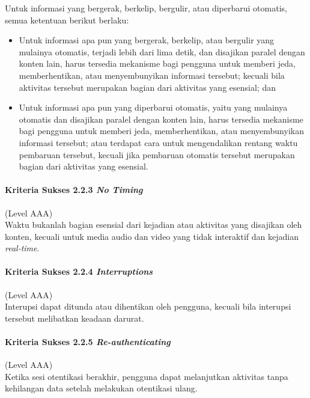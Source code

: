 Untuk informasi yang bergerak, berkelip, bergulir, atau diperbarui otomatis, semua ketentuan berikut berlaku:
\begin{itemize}
	\item Untuk informasi apa pun yang bergerak, berkelip, atau bergulir yang mulainya otomatis, terjadi lebih dari lima detik, dan disajikan paralel dengan konten lain, harus tersedia mekanisme bagi pengguna untuk memberi jeda, memberhentikan, atau menyembunyikan informasi tersebut; kecuali bila aktivitas tersebut merupakan bagian dari aktivitas yang esensial; dan
	\item Untuk informasi apa pun yang diperbarui otomatis, yaitu yang mulainya otomatis dan disajikan paralel dengan konten lain, harus tersedia mekanisme bagi pengguna untuk memberi jeda, memberhentikan, atau menyembunyikan informasi tersebut; atau terdapat cara untuk mengendalikan rentang waktu pembaruan tersebut, kecuali jika pembaruan otomatis tersebut merupakan bagian dari aktivitas yang esensial.
\end{itemize}

\paragraph{Kriteria Sukses 2.2.3 \textit{No Timing}}
\label{sec:kriteria_sukses_2.2.3}
(Level AAA)\\

Waktu bukanlah bagian esensial dari kejadian atau aktivitas yang disajikan oleh konten, kecuali untuk media audio dan video yang tidak interaktif dan kejadian \textit{real-time}.

\paragraph{Kriteria Sukses 2.2.4 \textit{Interruptions}}
\label{sec:kriteria_sukses_2.2.4}
(Level AAA)\\

Interupsi dapat ditunda atau dihentikan oleh pengguna, kecuali bila interupsi tersebut melibatkan keadaan darurat.

\paragraph{Kriteria Sukses 2.2.5 \textit{Re-authenticating}}
\label{sec:kriteria_sukses_2.2.5}
(Level AAA)\\

Ketika sesi otentikasi berakhir, pengguna dapat melanjutkan aktivitas tanpa kehilangan data setelah melakukan otentikasi ulang.

